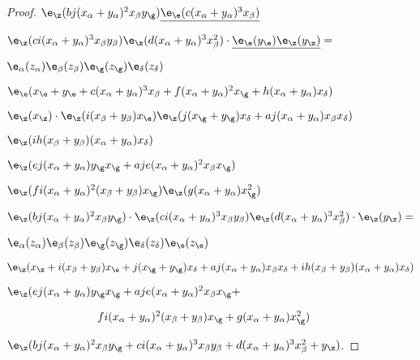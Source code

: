 \documentclass{memo-l}
\theoremstyle{definition}
\theoremstyle{remark}
\numberwithin{section}{chapter}
\numberwithin{equation}{chapter}
\begin{document}
\begin{proof}
${\e}_{{\z}}(bj(x_{\alpha}+
y_{\alpha})^{2}x_{\beta}y_{{\g}})
{\underline{{\e}_{{\e}}(c(x_{\alpha}+y_{\alpha}) ^{3}x_{\beta})}}$

${\e}_{{\z}}(ci(x_{\alpha}+y_{\alpha})^{3}x_{\beta}y_{\beta})
{\e}_{{\z}}(d(x_{\alpha}+y_{\alpha})^{3}x_{\beta}^{2}) \cdot
{\underline{{\e}_{{\e}}(y_{{\e}})
{\e}_{{\z}}(y_{{\z}})}} =$

\medpagebreak

$\e_\alpha(z_\alpha)\e_\beta(z_\beta)
{\e}_{{\g}}(z_{{\g}}){\e}_{{\delta}}(z_{{\delta}})$

${\e}_{{\e}}( x_{{\e}}+y_{{\e}}+c(x_{\alpha}+
y_{\alpha})^{3}x_{\beta}+f(x_{\alpha}+y_{\alpha})^{2}x_{{\g}}+
h(x_{\alpha}+y_{\alpha})x_{{\delta}})$

${\e}_{{\z}}(x_{{\z}}) \cdot {\e}_{{\z}}
(i(x_{\beta}+y_{\beta})x_{{\e}}){\e}_{{\z}}(j(x_{{\g}}+
y_{{\g}})x_{{\delta}}+aj(x_{\alpha}+y_\alpha)x_{\beta}x_{{\delta}})
$

${\e}_{{\z}}(ih(x_{\beta}+y_{\beta})(x_{\alpha}+
y_{\alpha})x_{{\delta}})$

${\e}_{{\z}}(ej(x_{\alpha}+y_{\alpha})y_{{\g}}x_{{\g}}+
aje(x_{\alpha}+y_{\alpha})^{2}x_{\beta}x_{{\g}})$

$
{\e}_{{\z}}(fi(x_{\alpha}+y_{\alpha})^{2}(x_{\beta}+y_{\beta})
x_{{\g}}){\e}_{{\z}}(g(x_{\alpha}+y_{\alpha})x_{{\g}}^2)$

${\e}_{{\z}}(bj(x_{\alpha}+y_{\alpha})^{2}x_{\beta}y_{{\g}})
\cdot {\e}_{{\z}}(ci(x_{\alpha}+y_{\alpha})^{3}
x_{\beta}y_{\beta}){\e}_{{\z}}(d(x_{\alpha}+y_{\alpha})^{3}
x_{\beta}^{2}) \cdot {\e}_{{\z}}(y_{\z}) =$

\medpagebreak


${\e}_{\alpha}(z_{\alpha}){\e}_{\beta}(z_{\beta})
{\e}_{{\g}}(z_{{\g}}){\e}_{{\delta}}(z_{{\delta}})
{\e}_{{\e}}(z_{{\e}})$

${\e}_{{\z}}(x_{{\z}} + i(x_{\beta}+y_{\beta})x_{{\e}} +
j(x_{{\g}}+y_{{\g}})x_{{\delta}} + aj(x_{\alpha}+y_{\alpha})
x_{\beta}x_{{\delta}} + ih(x_{\beta}+y_{\beta})(x_{\alpha}+y_{\alpha})
x_{{\delta}})$

${\e}_{{\z}}(ej(x_{\alpha}+y_{\alpha})y_{{\g}}x_{{\g}} +
aje(x_{\alpha}+y_{\alpha})^{2}x_{\beta}x_{{\g}} + $

$\qquad\qquad\qquad\qquad
fi(x_{\alpha}+ y_\alpha)^2(x_\beta+y_\beta)x_\g + g(x_\alpha+ y_\alpha)x_\g^2)$

${\e}_{{\z}}(bj(x_{\alpha}+y_{\alpha})^{2}x_{\beta}y_{{\g}}
+ ci(x_{\alpha}+y_{\alpha})^{3}x_{\beta}y_{\beta} +
d(x_{\alpha}+y_{\alpha})^{3}x_{\beta}^{2} + y_{{\z}})$.
\hfill
\end{proof}
{\medskip}
\end{document}
